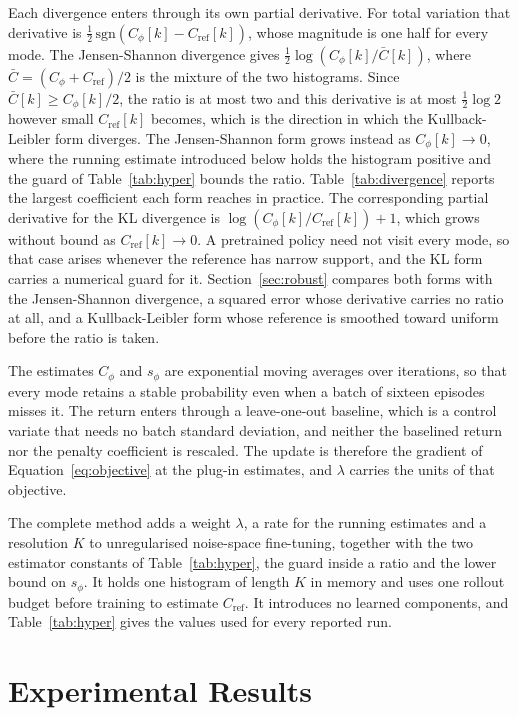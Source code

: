 \documentclass[preprint,12pt]{elsarticle}
\begin{document}
Each divergence enters through its own partial derivative. For total variation
that derivative is
$\tfrac{1}{2}\,\mathrm{sgn}\!\left(C_\phi[k] - C_{\mathrm{ref}}[k]\right)$, whose
magnitude is one half for every mode. The Jensen-Shannon divergence gives
$\tfrac{1}{2}\log\!\left(C_\phi[k] / \bar{C}[k]\right)$, where
$\bar{C} = (C_\phi + C_{\mathrm{ref}})/2$ is the mixture of the two histograms.
Since $\bar{C}[k] \geq C_\phi[k]/2$, the ratio is at most two and this
derivative is at most $\tfrac{1}{2}\log 2$ however small
$C_{\mathrm{ref}}[k]$ becomes, which is the direction in which the
Kullback-Leibler form diverges. The Jensen-Shannon form grows instead as
$C_\phi[k] \rightarrow 0$, where the running estimate introduced below holds
the histogram positive and the guard of Table~\ref{tab:hyper} bounds the
ratio.
Table~\ref{tab:divergence} reports the largest coefficient each form reaches
in practice. The corresponding partial derivative for the KL divergence is
$\log\!\left(C_\phi[k] / C_{\mathrm{ref}}[k]\right) + 1$, which grows without
bound as $C_{\mathrm{ref}}[k] \rightarrow 0$. A pretrained policy need not visit
every mode, so that case arises whenever the reference has narrow support, and
the KL form carries a numerical guard for it. Section~\ref{sec:robust}
compares both forms with the Jensen-Shannon divergence, a squared error whose
derivative carries no ratio at all, and a Kullback-Leibler form whose reference
is smoothed toward uniform before the ratio is taken.

The estimates $C_\phi$ and $s_\phi$ are exponential moving averages over
iterations, so that every mode retains a stable probability even when a batch of
sixteen episodes misses it. The return
enters through a leave-one-out baseline, which is a control variate that needs no
batch standard deviation, and neither the baselined return nor the penalty
coefficient is rescaled. The update is therefore the gradient of
Equation~\ref{eq:objective} at the plug-in estimates, and $\lambda$ carries the
units of that objective.

The complete method adds a weight $\lambda$, a rate for the running
estimates and a resolution $K$ to unregularised noise-space fine-tuning,
together with the two estimator constants of Table~\ref{tab:hyper}, the guard
inside a ratio and the lower bound on $s_\phi$. It holds one histogram of
length $K$ in memory and uses one rollout budget before training to estimate
$C_{\mathrm{ref}}$. It introduces no learned components, and
Table~\ref{tab:hyper} gives the values used for every reported run.
\section{Experimental Results}\label{sec:results}
\end{document}
